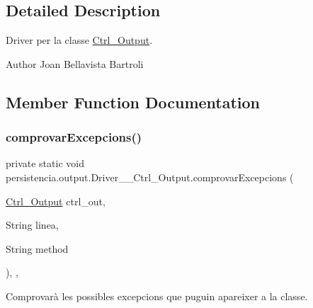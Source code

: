 \subsection{Detailed Description}
Driver per la classe \hyperlink{classpersistencia_1_1output_1_1Ctrl__Output}{Ctrl\+\_\+\+Output}. 

\begin{DoxyAuthor}{Author}
Joan Bellavista Bartroli 
\end{DoxyAuthor}


\subsection{Member Function Documentation}
\mbox{\label{classpersistencia_1_1output_1_1Driver____Ctrl__Output_a19885299457cf4049efde8b78a0f7627}} 
\subsubsection{\texorpdfstring{comprovar\+Excepcions()}{comprovarExcepcions()}}
{\footnotesize\ttfamily private static void persistencia.\+output.\+Driver\+\_\+\+\_\+\+Ctrl\+\_\+\+Output.\+comprovar\+Excepcions (\begin{DoxyParamCaption}\item[{\hyperlink{classpersistencia_1_1output_1_1Ctrl__Output}{Ctrl\+\_\+\+Output}}]{ctrl\+\_\+out,  }\item[{String}]{linea,  }\item[{String}]{method }\end{DoxyParamCaption})\hspace{0.3cm}{\ttfamily [inline]}, {\ttfamily [static]}, {\ttfamily [private]}}



Comprovarà les possibles excepcions que puguin apareixer a la classe. 



